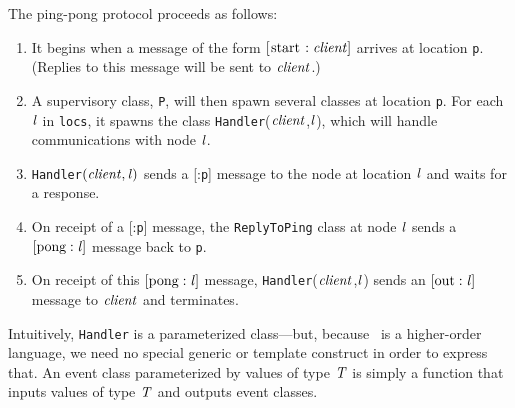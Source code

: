 \documentclass[final]{article}
\newcommand{\listinline}[1]{\text{\lstinline{#1}}}
\newcommand{\msg}[2]{\ensuremath{[\listinline{#1}:\NUPRL{#2}]}}
\newcommand{\MSG}[2]{[\listinline{#1}:#2]}
\begin{document}

The ping-pong protocol proceeds as follows:
\begin{enumerate}
\item
It begins when a message of the form \msg{start}{client} arrives at
location \lstinline{p}.  (Replies to this message will be sent to
$\mathit{client}$.)

\item
A supervisory class, \lstinline{P}, will then spawn several classes at
location \lstinline{p}.  For each $\mathit{l}$ in \lstinline{locs}, it
spawns the class \lstinline{Handler}($\mathit{client}$,$\mathit{l}$),
which will handle communications with node $\mathit{l}$.

\item\label{handler-ping}
  \lstinline{Handler}$(\mathit{client},\mathit{l})$ sends a
  \MSG{ping}{\lstinline{p}} message to the node at location
  $\mathit{l}$ and waits for a response.

\item
On receipt of a \MSG{ping}{\lstinline{p}} message, the
\lstinline{ReplyToPing} class at node $\mathit{l}$ sends a
\msg{pong}{l} message back to \lstinline{p}.

\item\label{handler-out}
On receipt of this \msg{pong}{l} message,
\lstinline{Handler}($\mathit{client}$,$\mathit{l}$) sends an
\msg{out}{l} message to $\mathit{client}$ and terminates.
\end{enumerate}
Intuitively, \lstinline{Handler} is a parameterized class---but,
because \eml\ is a higher-order language, we need no special generic
or template construct in order to express that.
%
%
An event class parameterized by values of type $\mathit{T}$ is simply a
function that inputs values of type $\mathit{T}$ and outputs event
classes.

\end{document}
